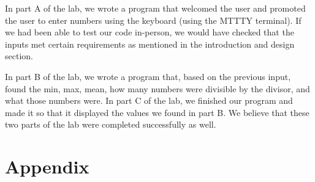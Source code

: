 \documentclass[10pt, letterpaper, titlepage]{article} %
\begin{document}
\begin{multicols*}{2}
In part A of the lab, we wrote a program that welcomed the user and promoted the user to enter numbers using the keyboard (using the MTTTY terminal). 
If we had been able to test our code in-person, we would have checked that the inputs met certain requirements as mentioned in the introduction and design section. 

In part B of the lab, we wrote a program that, based on the previous input, found the min, max, mean, how many numbers were divisible by the divisor, and what those numbers were. 
In part C of the lab, we finished our program and made it so that it displayed the values we found in part B. 
We believe that these two parts of the lab were completed successfully as well. 

\end{multicols*}

\newpage

\section{Appendix}
\end{document}
